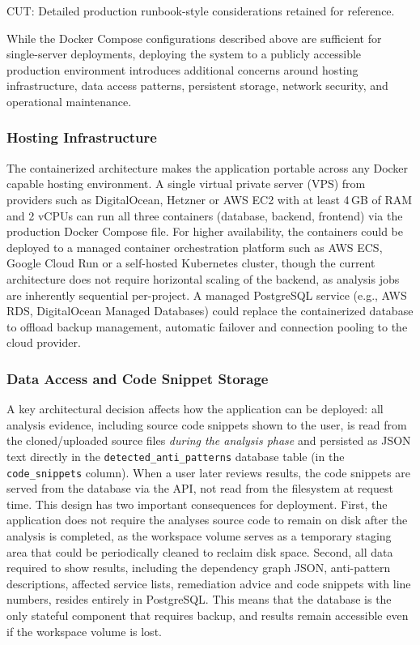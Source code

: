\iffalse
CUT: Detailed production runbook-style considerations retained for reference.
 \par While the Docker Compose configurations described above are sufficient for single-server deployments, deploying the system to a publicly accessible production environment introduces additional concerns around hosting infrastructure, data access patterns, persistent storage, network security, and operational maintenance.

\subsubsection{Hosting Infrastructure}
\label{subsubsec:hosting}

 \par The containerized architecture makes the application portable across any Docker capable hosting environment. A single virtual private server (VPS) from providers such as DigitalOcean, Hetzner or AWS EC2 with at least 4\,GB of RAM and 2 vCPUs can run all three containers (database, backend, frontend) via the production Docker Compose file. For higher availability, the containers could be deployed to a managed container orchestration platform such as AWS ECS, Google Cloud Run or a self-hosted Kubernetes cluster, though the current architecture does not require horizontal scaling of the backend, as analysis jobs are inherently sequential per-project. A managed PostgreSQL service (e.g., AWS RDS, DigitalOcean Managed Databases) could replace the containerized database to offload backup management, automatic failover and connection pooling to the cloud provider.

\subsubsection{Data Access and Code Snippet Storage}
\label{subsubsec:data-access}

 \par A key architectural decision affects how the application can be deployed: all analysis evidence, including source code snippets shown to the user, is read from the cloned/uploaded source files \textit{during the analysis phase} and persisted as JSON text directly in the \texttt{detected\_anti\_patterns} database table (in the \texttt{code\_snippets} column). When a user later reviews results, the code snippets are served from the database via the API, not read from the filesystem at request time. This design has two important consequences for deployment. First, the application does not require the analyses source code to remain on disk after the analysis is completed, as the workspace volume serves as a temporary staging area that could be periodically cleaned to reclaim disk space. Second, all data required to show results, including the dependency graph JSON, anti-pattern descriptions, affected service lists, remediation advice and code snippets with line numbers, resides entirely in PostgreSQL. This means that the database is the only stateful component that requires backup, and results remain accessible even if the workspace volume is lost.

